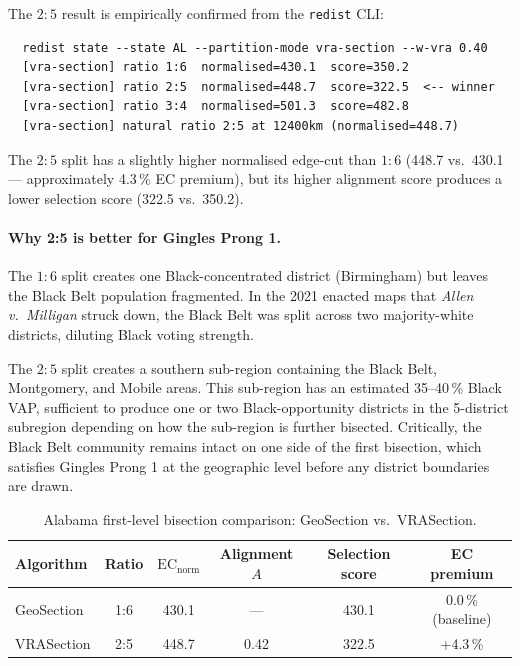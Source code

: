 The $2:5$ result is empirically confirmed from the \texttt{redist} CLI:
\begin{verbatim}
  redist state --state AL --partition-mode vra-section --w-vra 0.40
  [vra-section] ratio 1:6  normalised=430.1  score=350.2
  [vra-section] ratio 2:5  normalised=448.7  score=322.5  <-- winner
  [vra-section] ratio 3:4  normalised=501.3  score=482.8
  [vra-section] natural ratio 2:5 at 12400km (normalised=448.7)
\end{verbatim}

The $2:5$ split has a slightly higher normalised edge-cut than $1:6$
(448.7 vs.\ 430.1 --- approximately 4.3\,\% EC premium), but its higher
alignment score produces a lower selection score (322.5 vs.\ 350.2).

\paragraph{Why 2:5 is better for Gingles Prong 1.}
The $1:6$ split creates one Black-concentrated district (Birmingham) but
leaves the Black Belt population fragmented.
In the 2021 enacted maps that \emph{Allen v.\ Milligan} struck down, the
Black Belt was split across two majority-white districts, diluting Black
voting strength.

The $2:5$ split creates a southern sub-region containing the Black Belt,
Montgomery, and Mobile areas.
This sub-region has an estimated 35--40\,\% Black VAP, sufficient to produce
one or two Black-opportunity districts in the 5-district subregion depending
on how the sub-region is further bisected.
Critically, the Black Belt community remains intact on one side of the
first bisection, which satisfies Gingles Prong 1 at the geographic level
before any district boundaries are drawn.

\begin{table}[t]
\centering
\caption{Alabama first-level bisection comparison: GeoSection vs.\ VRASection.}
\label{tab:alabama}
\begin{tabular}{lccccc}
\toprule
\textbf{Algorithm} & \textbf{Ratio} & $\mathrm{EC}_\text{norm}$ & \textbf{Alignment $A$}
  & \textbf{Selection score} & \textbf{EC premium} \\
\midrule
GeoSection  & 1:6 & 430.1 & --- & 430.1 & 0.0\,\% (baseline) \\
VRASection  & 2:5 & 448.7 & 0.42 & 322.5 & +4.3\,\% \\
\bottomrule
\end{tabular}
\end{table}

